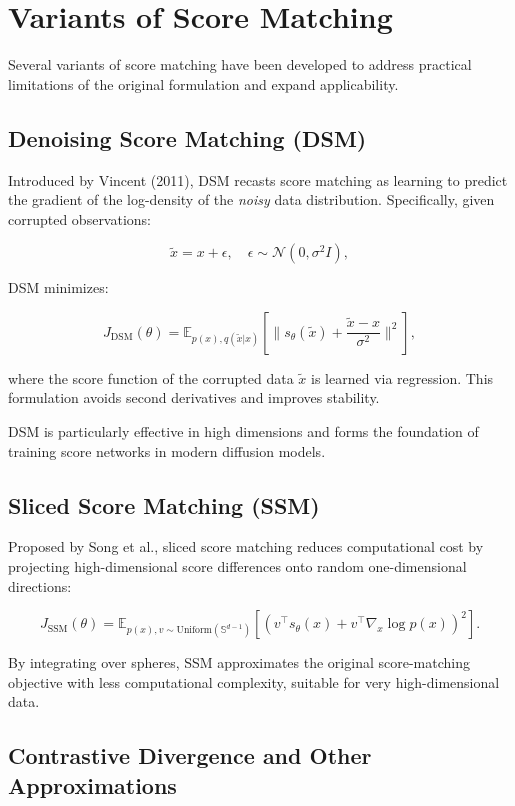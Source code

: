 \section{Variants of Score Matching}

Several variants of score matching have been developed to address practical limitations of the original formulation and expand applicability.

\subsection{Denoising Score Matching (DSM)}

Introduced by Vincent (2011), DSM recasts score matching as learning to predict the gradient of the log-density of the \emph{noisy} data distribution. Specifically, given corrupted observations:

\[
\tilde{x} = x + \epsilon, \quad \epsilon \sim \mathcal{N}(0, \sigma^2 I),
\]

DSM minimizes:

\[
J_\text{DSM}(\theta) = \mathbb{E}_{p(x), q(\tilde{x} | x)} \left[ \| s_\theta(\tilde{x}) + \frac{\tilde{x} - x}{\sigma^2} \|^2 \right],
\]

where the score function of the corrupted data \( \tilde{x} \) is learned via regression. This formulation avoids second derivatives and improves stability.

DSM is particularly effective in high dimensions and forms the foundation of training score networks in modern diffusion models.

\subsection{Sliced Score Matching (SSM)}

Proposed by Song et al., sliced score matching reduces computational cost by projecting high-dimensional score differences onto random one-dimensional directions:

\[
J_\text{SSM}(\theta) = \mathbb{E}_{p(x), v \sim \text{Uniform}(\mathbb{S}^{d-1})} \left[ \left( v^\top s_\theta(x) + v^\top \nabla_x \log p(x) \right)^2 \right].
\]

By integrating over spheres, SSM approximates the original score-matching objective with less computational complexity, suitable for very high-dimensional data.

\subsection{Contrastive Divergence and Other Approximations}

